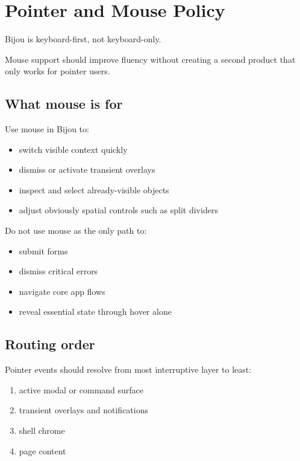 \chapter{Pointer and Mouse Policy}\label{record-024}

\smallskip

Bijou is keyboard-first, not keyboard-only.

Mouse support should improve fluency without creating a second product that only works for pointer users.

\section{What mouse is for}\label{record-024-what-mouse-is-for}

Use mouse in Bijou to:

\begin{itemize}
\tightlist
\item
  switch visible context quickly
\item
  dismiss or activate transient overlays
\item
  inspect and select already-visible objects
\item
  adjust obviously spatial controls such as split dividers
\end{itemize}

Do not use mouse as the only path to:

\begin{itemize}
\tightlist
\item
  submit forms
\item
  dismiss critical errors
\item
  navigate core app flows
\item
  reveal essential state through hover alone
\end{itemize}

\section{Routing order}\label{record-024-routing-order}

Pointer events should resolve from most interruptive layer to least:

\begin{enumerate}
\def\labelenumi{\arabic{enumi}.}
\tightlist
\item
  active modal or command surface
\item
  transient overlays and notifications
\item
  shell chrome
\item
  page content
\end{enumerate}

